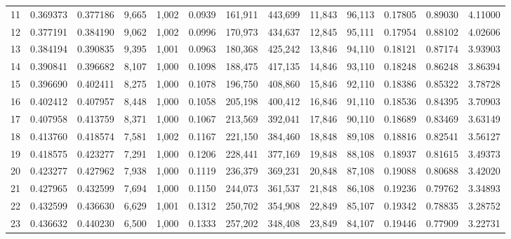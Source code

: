 \begin{tabular}{rrrrrrrrrrrrr}
11  &  0.369373 &  0.377186 &   9,665 &  1,002 &                                     0.0939 &  161,911 &  443,699 &   11,843 &   96,113 &  0.17805 &  0.89030 &  4.11000 \\
12  &  0.377191 &  0.384190 &   9,062 &  1,002 &                                     0.0996 &  170,973 &  434,637 &   12,845 &   95,111 &  0.17954 &  0.88102 &  4.02606 \\
13  &  0.384194 &  0.390835 &   9,395 &  1,001 &                                     0.0963 &  180,368 &  425,242 &   13,846 &   94,110 &  0.18121 &  0.87174 &  3.93903 \\
14  &  0.390841 &  0.396682 &   8,107 &  1,000 &                                     0.1098 &  188,475 &  417,135 &   14,846 &   93,110 &  0.18248 &  0.86248 &  3.86394 \\
15  &  0.396690 &  0.402411 &   8,275 &  1,000 &                                     0.1078 &  196,750 &  408,860 &   15,846 &   92,110 &  0.18386 &  0.85322 &  3.78728 \\
16  &  0.402412 &  0.407957 &   8,448 &  1,000 &                                     0.1058 &  205,198 &  400,412 &   16,846 &   91,110 &  0.18536 &  0.84395 &  3.70903 \\
17  &  0.407958 &  0.413759 &   8,371 &  1,000 &                                     0.1067 &  213,569 &  392,041 &   17,846 &   90,110 &  0.18689 &  0.83469 &  3.63149 \\
18  &  0.413760 &  0.418574 &   7,581 &  1,002 &                                     0.1167 &  221,150 &  384,460 &   18,848 &   89,108 &  0.18816 &  0.82541 &  3.56127 \\
19  &  0.418575 &  0.423277 &   7,291 &  1,000 &                                     0.1206 &  228,441 &  377,169 &   19,848 &   88,108 &  0.18937 &  0.81615 &  3.49373 \\
20  &  0.423277 &  0.427962 &   7,938 &  1,000 &                                     0.1119 &  236,379 &  369,231 &   20,848 &   87,108 &  0.19088 &  0.80688 &  3.42020 \\
21  &  0.427965 &  0.432599 &   7,694 &  1,000 &                                     0.1150 &  244,073 &  361,537 &   21,848 &   86,108 &  0.19236 &  0.79762 &  3.34893 \\
22  &  0.432599 &  0.436630 &   6,629 &  1,001 &                                     0.1312 &  250,702 &  354,908 &   22,849 &   85,107 &  0.19342 &  0.78835 &  3.28752 \\
23  &  0.436632 &  0.440230 &   6,500 &  1,000 &                                     0.1333 &  257,202 &  348,408 &   23,849 &   84,107 &  0.19446 &  0.77909 &  3.22731 \\

\end{tabular}
